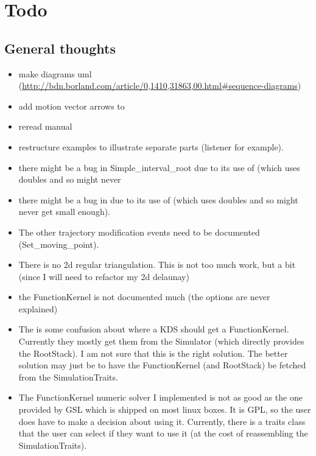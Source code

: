 \section{Todo}

\subsection{General thoughts}

\begin{itemize}

\item make diagrams uml (\url{http://bdn.borland.com/article/0,1410,31863,00.html#sequence-diagrams})

\item add motion vector arrows to 

\item reread manual

\item restructure examples to illustrate separate parts (listener for example).

\item there might be a bug in Simple\_interval\_root due to its use of
   (which uses doubles and so might never

\item there might be a bug in  due to its use of
   (which uses doubles and so might never
  get small enough).

\item The other trajectory modification events need to be documented
  (Set\_moving\_point). 

\item There is no 2d regular triangulation. This is not too much work,
  but a bit (since I will need to refactor my 2d delaunay)

\item the FunctionKernel is not documented much (the options are never
  explained)

\item The is some confusion about where a KDS should get a
  FunctionKernel. Currently they mostly get them from the Simulator
  (which directly provides the RootStack). I am not sure that this is
  the right solution. The better solution may just be to have the
  FunctionKernel (and RootStack) be fetched from the SimulationTraits.

\item The FunctionKernel numeric solver I implemented is not as good
  as the one provided by GSL which is shipped on most linux boxes. It
  is GPL, so the user does have to make a decision about using it.
  Currently, there is a traits class that the user can select if they
  want to use it (at the cost of reassembling the SimulationTraits).


\end{itemize}

